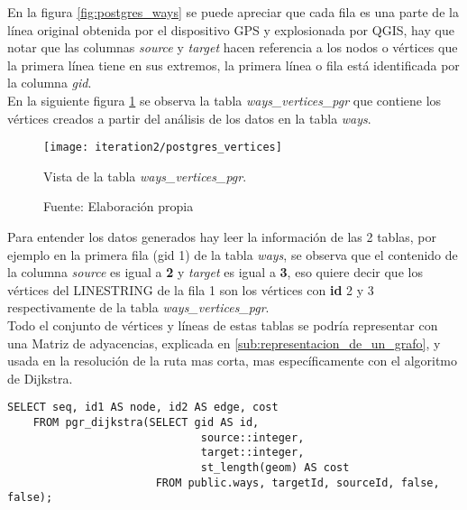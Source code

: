 En la figura \ref{fig:postgres_ways} se puede apreciar que cada fila es una parte de la línea original obtenida por el dispositivo GPS y explosionada por QGIS, hay que notar que las columnas \emph{source} y \emph{target} hacen referencia a los nodos o vértices que la primera línea tiene en sus extremos, la primera línea o fila está identificada por la columna \emph{gid}.\\

En la siguiente figura \ref{fig:postgres_vertices} se observa la tabla \emph{ways\_vertices\_pgr} que contiene los vértices creados a partir del análisis de los datos en la tabla \emph{ways}.

\begin{figure}[H]
  \begin{center}
    \texttt{[image: iteration2/postgres\_vertices]}
    \caption{Vista de la tabla \emph{ways\_vertices\_pgr}.}
    \label{fig:postgres_vertices}
    \caption*{Fuente: Elaboración propia}
  \end{center}
\end{figure}

Para entender los datos generados hay leer la información de las 2 tablas, por ejemplo en la primera  fila (gid 1) de la tabla \emph{ways}, se observa que el contenido de la columna \emph{source} es igual a \textbf{2} y \emph{target} es igual a \textbf{3}, eso quiere decir que los vértices del LINESTRING de la fila 1 son los vértices con \textbf{id} 2 y 3 respectivamente de la tabla \emph{ways\_vertices\_pgr}.\\


Todo el conjunto de vértices y líneas de estas tablas se podría representar con una Matriz de adyacencias, explicada en \ref{sub:representacion_de_un_grafo}, y usada en la resolución de la ruta mas corta, mas específicamente con el algoritmo de Dijkstra.\\

\begin{center}
  \begin{lstlisting}[label=pgr_dijkstra,caption=Algoritmo de Dijkstra implementado en \emph{pRouting}]
    SELECT seq, id1 AS node, id2 AS edge, cost
    FROM pgr_dijkstra(SELECT gid AS id,
                              source::integer,
                              target::integer,
                              st_length(geom) AS cost
                       FROM public.ways, targetId, sourceId, false, false);
  \end{lstlisting}
\end{center}


